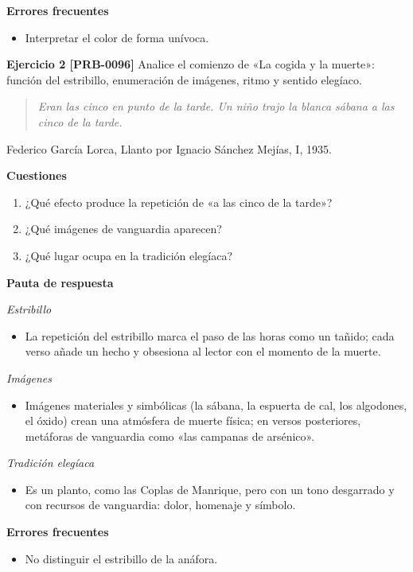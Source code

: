 \documentclass{book}
\begin{document}
\noindent\textbf{Errores frecuentes}
\begin{itemize}
\item Interpretar el color de forma unívoca.
\end{itemize}

\noindent\textbf{Ejercicio 2 [PRB-0096]}
Analice el comienzo de «La cogida y la muerte»: función del estribillo, enumeración de imágenes, ritmo y sentido elegíaco.


\begin{quote}
\itshape Eran las cinco en punto de la tarde. Un niño trajo la blanca sábana a las cinco de la tarde.
\end{quote}
{\noindent\footnotesize Federico García Lorca, Llanto por Ignacio Sánchez Mejías, I, 1935.\par}

\noindent\textbf{Cuestiones}
\begin{enumerate}
\item ¿Qué efecto produce la repetición de «a las cinco de la tarde»?
\item ¿Qué imágenes de vanguardia aparecen?
\item ¿Qué lugar ocupa en la tradición elegíaca?
\end{enumerate}

\noindent\textbf{Pauta de respuesta}

\noindent\textit{Estribillo}
\begin{itemize}
\item La repetición del estribillo marca el paso de las horas como un tañido; cada verso añade un hecho y obsesiona al lector con el momento de la muerte.
\end{itemize}

\noindent\textit{Imágenes}
\begin{itemize}
\item Imágenes materiales y simbólicas (la sábana, la espuerta de cal, los algodones, el óxido) crean una atmósfera de muerte física; en versos posteriores, metáforas de vanguardia como «las campanas de arsénico».
\end{itemize}

\noindent\textit{Tradición elegíaca}
\begin{itemize}
\item Es un planto, como las Coplas de Manrique, pero con un tono desgarrado y con recursos de vanguardia: dolor, homenaje y símbolo.
\end{itemize}

\noindent\textbf{Errores frecuentes}
\begin{itemize}
\item No distinguir el estribillo de la anáfora.
\end{itemize}
\end{document}
